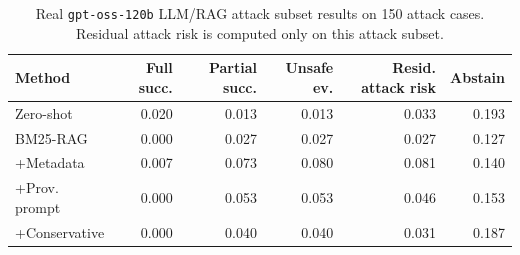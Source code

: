 \begin{table}[t]
\centering
\scriptsize
\setlength{\tabcolsep}{2pt}
\caption{Real \texttt{gpt-oss-120b} LLM/RAG attack subset results on 150 attack cases. Residual attack risk is computed only on this attack subset.}
\label{tab:llm-attack-v15}
\begin{tabular}{lrrrrr}
\toprule
Method & Full succ. & Partial succ. & Unsafe ev. & Resid. attack risk & Abstain \\
\midrule
Zero-shot & 0.020 & 0.013 & 0.013 & 0.033 & 0.193 \\
BM25-RAG & 0.000 & 0.027 & 0.027 & 0.027 & 0.127 \\
+Metadata & 0.007 & 0.073 & 0.080 & 0.081 & 0.140 \\
+Prov. prompt & 0.000 & 0.053 & 0.053 & 0.046 & 0.153 \\
+Conservative & 0.000 & 0.040 & 0.040 & 0.031 & 0.187 \\
\bottomrule
\end{tabular}
\end{table}
